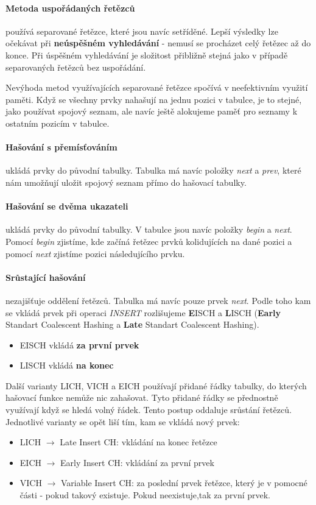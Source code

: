 \documentclass[a4paper]{article}      %
\begin{document}
\paragraph{Metoda uspořádaných řetězců} používá separované řetězce, které jsou navíc setříděné.
Lepší výsledky lze očekávat při \textbf{neúspěšném vyhledávání} - nemusí se procházet celý řetězec až do konce.
Při úspěšném vyhledávání je složitost přibližně stejná jako v případě separovaných řetězců bez uspořádání.

Nevýhoda metod využívajících separované řetězce spočívá v neefektivním využití paměti.
Když se všechny prvky nahašují na jednu pozici v tabulce, je to stejné, jako používat spojový seznam,
ale navíc ještě alokujeme paměť pro seznamy k ostatním pozicím v tabulce.

\paragraph{Hašování s přemísťováním} ukládá prvky do původní tabulky. Tabulka má navíc položky \emph{next} a \emph{prev},
které nám umožňují uložit spojový seznam přímo do hašovací tabulky.

\paragraph{Hašování se dvěma ukazateli} ukládá prvky do původní tabulky. V tabulce jsou navíc položky \emph{begin} a \emph{next}.
Pomocí \emph{begin} zjistíme, kde začíná řetězec prvků kolidujících na dané pozici a pomocí \emph{next} zjistíme pozici následujícího prvku.

\paragraph{Srůstající hašování} nezajišťuje oddělení řetězců. Tabulka má navíc pouze prvek \emph{next}.
Podle toho kam se vkládá prvek při operaci \emph{INSERT} rozlišujeme \textbf{E}ISCH a \textbf{L}ISCH
(\textbf{Early} Standart Coalescent Hashing a \textbf{Late} Standart Coalescent Hashing).
\begin{itemize}
\item EISCH vkládá \textbf{za první prvek}
\item LISCH vkládá \textbf{na konec}
\end{itemize}

Další varianty LICH, VICH a EICH používají přidané řádky tabulky, do kterých hašovací funkce nemůže nic zahašovat. Tyto přidané řádky
se přednostně využívají když se hledá volný řádek. Tento postup oddaluje srůstání řetězců. Jednotlivé varianty se opět liší tím,
kam se vkládá nový prvek:
\begin{itemize}
\item LICH $\rightarrow$ Late Insert CH: vkládání na konec řetězce
\item EICH $\rightarrow$ Early Insert CH: vkládání za první prvek
\item VICH $\rightarrow$ Variable Insert CH: za poslední prvek řetězce, který je v pomocné části - pokud takový existuje. Pokud neexistuje,tak za první prvek.
\end{itemize}
\end{document}
